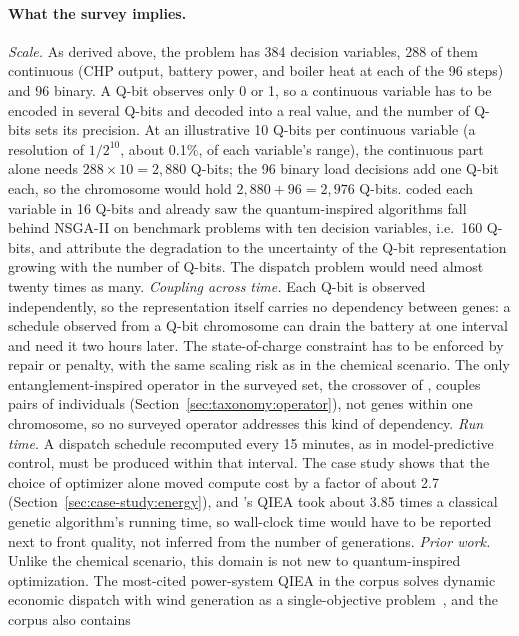\paragraph{What the survey implies.}
\emph{Scale.} As derived above, the problem has 384 decision
variables, 288 of them continuous (CHP output, battery power, and
boiler heat at each of the 96 steps) and 96 binary. A Q-bit observes only 0 or 1, so a continuous variable has
to be encoded in several Q-bits and decoded into a real value, and the
number of Q-bits sets its precision. At an illustrative 10 Q-bits per
continuous variable (a resolution of $1/2^{10}$, about 0.1\%, of each
variable's range), the continuous part alone needs
$288 \times 10 = 2{,}880$ Q-bits; the 96 binary load decisions add one
Q-bit each, so the chromosome would hold $2{,}880 + 96 = 2{,}976$
Q-bits. \citet{olvera2023continuous} coded each variable in 16 Q-bits
and already saw the quantum-inspired algorithms fall behind NSGA-II on
benchmark problems with ten decision variables, i.e.\ 160 Q-bits, and
attribute the degradation to the uncertainty of the Q-bit
representation growing with the number of Q-bits. The dispatch problem
would need almost twenty times as many. \emph{Coupling across time.} Each Q-bit
is observed independently, so the representation itself carries no
dependency between genes: a schedule observed from a Q-bit chromosome
can drain the battery at one interval and need it two hours later. The
state-of-charge constraint has to be enforced by repair or penalty, with
the same scaling risk as in the chemical scenario. The only
entanglement-inspired operator in the surveyed set, the crossover of
\citet{kumar2026eahqnsga2}, couples pairs of individuals
(Section~\ref{sec:taxonomy:operator}), not genes within one chromosome,
so no surveyed operator addresses this kind of dependency. \emph{Run time.} A dispatch
schedule recomputed every 15 minutes, as in model-predictive control,
must be produced within that interval. The case study shows that the
choice of optimizer alone moved compute cost by a factor of about 2.7
(Section~\ref{sec:case-study:energy}), and \citet{gilea2026waste}'s
QIEA took about 3.85 times a classical genetic algorithm's running time,
so wall-clock time would have to be reported next to front quality,
not inferred from the number of generations. \emph{Prior work.} Unlike
the chemical scenario, this domain is not new to quantum-inspired
optimization. The most-cited power-system QIEA in the corpus solves
dynamic economic dispatch with wind generation as a single-objective
problem~\citep{lee2011qgadispatch}, and the corpus also contains
